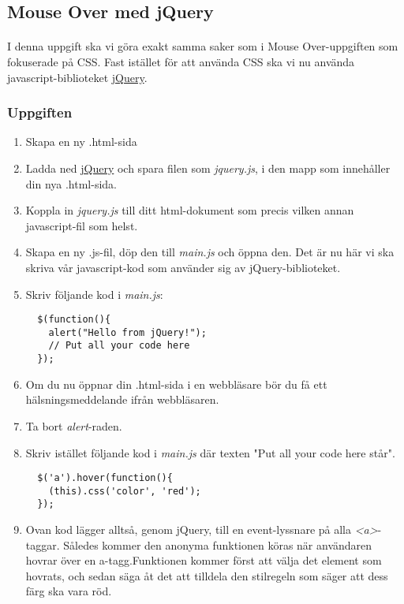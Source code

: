 \documentclass{article}
\begin{document}
  \subsection{ Mouse Over med jQuery }
    \paragraph{}
    I denna uppgift ska vi göra exakt samma saker som i Mouse Over-uppgiften som fokuserade på CSS. Fast istället för att använda CSS ska vi nu använda javascript-biblioteket \href{http://jquery.com/download/}{jQuery}.

    \subsubsection*{Uppgiften}
      \begin{enumerate}
        \item Skapa en ny .html-sida
        \item Ladda ned \href{http://code.jquery.com/jquery-1.10.2.min.js}{jQuery} och spara filen som \emph{jquery.js}, i den mapp som innehåller din nya .html-sida.
        \item Koppla in \emph{jquery.js} till ditt html-dokument som precis vilken annan javascript-fil som helst.
        \item Skapa en ny .js-fil, döp den till \emph{main.js} och öppna den. Det är nu här vi ska skriva vår javascript-kod som använder sig av jQuery-biblioteket.
        \item Skriv följande kod i \emph{main.js}:
          \lstset{language=JavaScript}
          \begin{lstlisting}
  $(function(){
    alert("Hello from jQuery!");
    // Put all your code here
  });
          \end{lstlisting}
        \item Om du nu öppnar din .html-sida i en webbläsare bör du få ett hälsningsmeddelande ifrån webbläsaren.
        \item Ta bort \emph{alert}-raden.
        \item Skriv istället följande kod i \emph{main.js} där texten "Put all your code here står".
          \begin{lstlisting}
  $('a').hover(function(){
    (this).css('color', 'red');
  });
          \end{lstlisting}
        \item Ovan kod lägger alltså, genom jQuery, till en event-lyssnare på alla \emph{<a>}-taggar. Således kommer den anonyma funktionen köras när användaren hovrar över en a-tagg.Funktionen kommer först att välja det element som hovrats, och sedan säga åt det att tilldela den stilregeln som säger att dess färg ska vara röd.

\end{enumerate}
\end{document}
